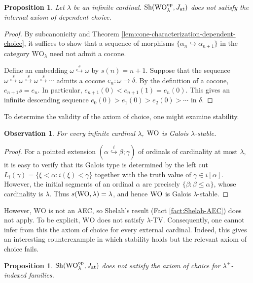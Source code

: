 \documentclass[10pt]{amsart}
\numberwithin{equation}{section}
\theoremstyle{plain}
\newtheorem{prop}[theorem]{Proposition}
\newtheorem{obs}[theorem]{Observation}
\theoremstyle{definition}
\newcommand{\om}{\omega}
\newcommand{\embed}{\hookrightarrow}
\newcommand{\embedge}[1]{\overset{#1}{\embed}}
\begin{document}
\begin{prop}
Let $\lambda$ be an infinite cardinal.
$\mathrm{Sh}(\mathrm{WO}^{\rm op}_\lambda,J_{\rm at})$ does not satisfy the internal axiom of dependent choice.
\end{prop}

\begin{proof}
By subcanonicity and Theorem \ref{lem:cone-characterization-dependent-choice}, it suffices to show that a sequence of morphisms $\{\alpha_n\embed\alpha_{n+1}\}$ in the category $\mathrm{WO}_\lambda$ need not admit a cocone.


Define an embedding $\om\embedge{s}\om$ by $s(n)=n+1$.
Suppose that the sequence $\om\embedge{s}\om\embedge{s}\om\embedge{s}\cdots$ admits a cocone $e_n\colon\om\to\delta$.
By the definition of a cocone, $e_{n+1}s=e_n$.
In particular, $e_{n+1}(0)<e_{n+1}(1)=e_n(0)$.
This gives an infinite descending sequence $e_0(0)>e_1(0)>e_2(0)>\cdots$ in $\delta$.
\end{proof}

To determine the validity of the axiom of choice, one might examine stability.
\begin{obs}
For every infinite cardinal $\lambda$, ${\rm WO}$ is Galois $\lambda$-stable.
\end{obs}

\begin{proof}
For a pointed extension $(\alpha\embedge{i}\beta;\gamma)$ of ordinals of cardinality at most $\lambda$, it is easy to verify that its Galois type is determined by the left cut $L_i(\gamma)=\{\xi<\alpha:i(\xi)<\gamma\}$ together with the truth value of $\gamma\in i[\alpha]$.
However, the initial segments of an ordinal $\alpha$ are precisely $\{\beta:\beta\leq\alpha\}$, whose cardinality is $\lambda$.
Thus $s({\rm WO},\lambda)=\lambda$, and hence ${\rm WO}$ is Galois $\lambda$-stable.
\end{proof}

However, $\mathrm{WO}$ is not an AEC, so Shelah's result (Fact \ref{fact:Shelah-AEC}) does not apply.
To be explicit, $\mathrm{WO}$ does not satisfy $\lambda$-TV.
Consequently, one cannot infer from this the axiom of choice for every external cardinal.
Indeed, this gives an interesting counterexample in which stability holds but the relevant axiom of choice fails.

\begin{prop}
${\rm Sh}({\rm WO}_\lambda^{\rm op},J_{\rm at})$ does not satisfy the axiom of choice for $\lambda^+$-indexed families.
\end{prop}
\end{document}
